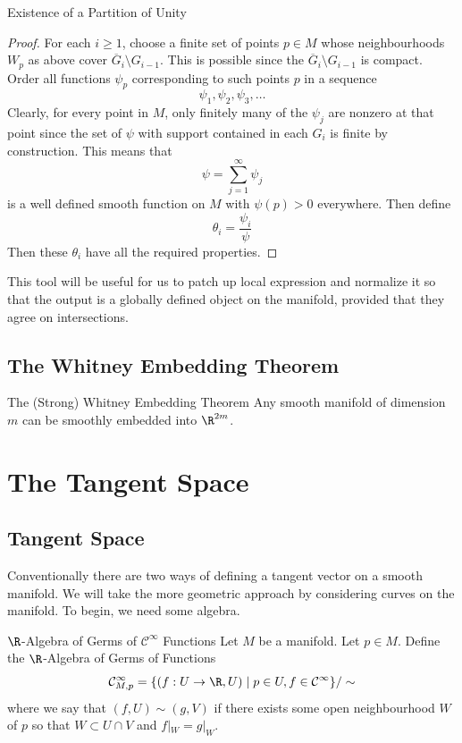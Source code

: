 \documentclass[a4paper]{article}
\begin{document}
\begin{thm}{Existence of a Partition of Unity}{}
\begin{proof}
For each $i\geq 1$, choose a finite set of points $p\in M$ whose neighbourhoods $W_p$ as above cover $\overline{G}_i\setminus G_{i-1}$. This is possible since the $\overline{G}_i\setminus G_{i-1}$ is compact. Order all functions $\psi_p$ corresponding to such points $p$ in a sequence $$\psi_1,\psi_2,\psi_3,\dots$$ Clearly, for every point in $M$, only finitely many of the $\psi_j$ are nonzero at that point since the set of $\psi$ with support contained in each $G_i$ is finite by construction. This means that $$\psi=\sum_{j=1}^\infty\psi_j$$ is a well defined smooth function on $M$ with $\psi(p)>0$ everywhere. Then define $$\theta_i=\frac{\psi_i}{\psi}$$ Then these $\theta_i$ have all the required properties. 
\end{proof}
\end{thm}

This tool will be useful for us to patch up local expression and normalize it so that the output is a globally defined object on the manifold, provided that they agree on intersections. 

\subsection{The Whitney Embedding Theorem}
\begin{thm}{The (Strong) Whitney Embedding Theorem}{} Any smooth manifold of dimension $m$ can be smoothly embedded into $\R^{2m}$. 
\end{thm}

\pagebreak
\section{The Tangent Space}
\subsection{Tangent Space}
Conventionally there are two ways of defining a tangent vector on a smooth manifold. We will take the more geometric approach by considering curves on the manifold. To begin, we need some algebra. 

\begin{defn}{$\R$-Algebra of Germs of $\mathcal{C}^\infty$ Functions}{} Let $M$ be a manifold. Let $p\in M$. Define the $\R$-Algebra of Germs of Functions $$\mathcal{C}_{M,p}^\infty=\{(f:U\to\R, U)\;|\;p\in U, f\in\mathcal{C}^\infty\}/\sim$$ where we say that $(f,U)\sim(g,V)$ if there exists some open neighbourhood $W$ of $p$ so that $W\subset U\cap V$ and $f|_W=g|_W$. 
\end{defn}
\end{document}

